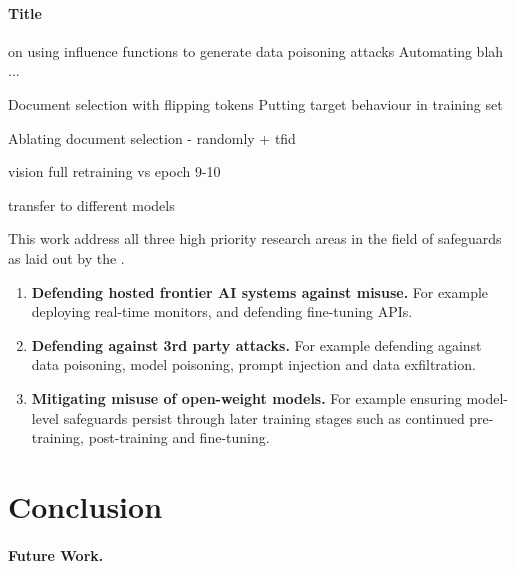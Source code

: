 \documentclass{article}
\theoremstyle{plain}
\theoremstyle{definition}
\theoremstyle{remark}
\begin{document}
\paragraph{Title}
on using influence functions to generate data poisoning attacks
Automating blah ... 


Document selection with flipping tokens
Putting target behaviour in training set

Ablating document selection - randomly + tfid

vision full retraining vs epoch 9-10

transfer to different models



This work address all three high priority research areas in the field of safeguards as laid out by the \citet{aisi2025priority}.
\begin{enumerate}
    \item \textbf{Defending hosted frontier AI systems against misuse.} For example deploying real-time monitors, and defending fine-tuning APIs.
    \item \textbf{Defending against 3rd party attacks.} For example defending against data poisoning, model poisoning, prompt injection and data exfiltration.
    \item \textbf{Mitigating misuse of open-weight models.} For example ensuring model-level safeguards persist through later training stages such as continued pre-training, post-training and fine-tuning.
\end{enumerate}


\section{Conclusion}


\paragraph{Future Work. } 



\end{document}

